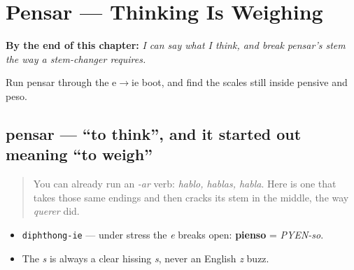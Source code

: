 
\chapter{Pensar — Thinking Is Weighing}
\label{ch:spanish-pensar}

\begin{chapteropening}
\textbf{By the end of this chapter:} \emph{I can say what I think, and break pensar's stem the way a stem-changer requires.}

Run pensar through the e$\to$ie boot, and find the scales still inside pensive and peso.
\end{chapteropening}

\section[pensar]{pensar — \textquotedblleft{}to think\textquotedblright{}, and it started out meaning \textquotedblleft{}to weigh\textquotedblright{}}

\label{lesson:ES-C34-pensar}



\begin{quote}
You can already run an \emph{-ar} verb: \emph{hablo, hablas, habla}. Here is one that takes those same endings and then cracks its stem in the middle, the way \emph{querer} did.
\end{quote}

\begin{sounds}
\begin{itemize}
\raggedright
  \item \texttt{diphthong-ie} — under stress the \emph{e} breaks open: \textbf{pienso} = \emph{PYEN-so}.
  \item The \emph{s} is always a clear hissing \emph{s}, never an English \emph{z} buzz.
\end{itemize}
\end{sounds}

